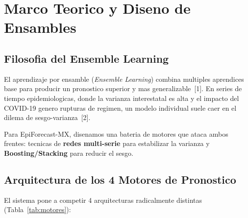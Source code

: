 \documentclass[12pt, letterpaper]{article}
\newcommand{\tabref}[1]{Tabla~\ref{#1}}
\begin{document}
\newpage

\section{Marco Teorico y Diseno de Ensambles}\label{sec:marco}

\subsection{Filosofia del Ensemble Learning}
El aprendizaje por ensamble (\textit{Ensemble Learning}) combina multiples aprendices base para producir un pronostico superior y mas generalizable~[1]. En series de tiempo epidemiologicas, donde la varianza interestatal es alta y el impacto del COVID-19 genero rupturas de regimen, un modelo individual suele caer en el dilema de sesgo-varianza~[2].

Para EpiForecast-MX, disenamos una bateria de motores que ataca ambos frentes: tecnicas de \textbf{redes multi-serie} para estabilizar la varianza y \textbf{Boosting/Stacking} para reducir el sesgo.

\subsection{Arquitectura de los 4 Motores de Pronostico}

El sistema pone a competir 4 arquitecturas radicalmente distintas (\tabref{tab:motores}):
\end{document}
